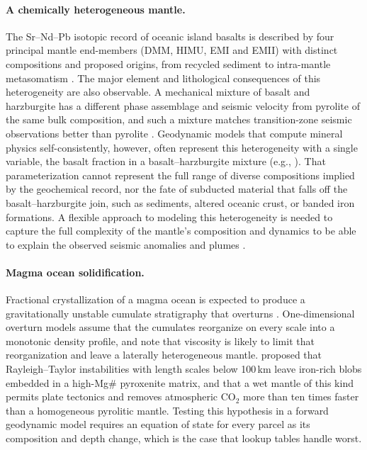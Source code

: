 \paragraph{A chemically heterogeneous mantle.} The Sr--Nd--Pb isotopic record of oceanic island basalts is described by four
principal mantle end-members (DMM, HIMU, EMI and EMII) with distinct compositions and proposed origins, from recycled sediment to intra-mantle
metasomatism \citep{hart1988,stracke2005}. The major
element and lithological consequences of this heterogeneity are also observable. A mechanical mixture of basalt and harzburgite
has a different phase assemblage and seismic velocity from pyrolite of the same bulk composition, and such a mixture matches
transition-zone seismic observations better than pyrolite \citep{xu2008,stixrude2012}. Geodynamic models that compute mineral
physics self-consistently, however, often represent this heterogeneity with a single variable, the basalt fraction in a
basalt--harzburgite mixture (e.g., \citealp{nakagawa2010,yuan2026}). That parameterization cannot represent the full range of diverse compositions implied by
the geochemical record, nor the fate of subducted material that falls off the basalt--harzburgite join, such as sediments, altered
oceanic crust, or banded iron formations. A flexible approach to modeling this heterogeneity is needed to capture the full complexity 
of the mantle's composition and dynamics to be able to explain the observed seismic anomalies and plumes \citep{keller2023,dobson2005}.

\paragraph{Magma ocean solidification.} Fractional crystallization of a magma ocean is expected to produce a gravitationally unstable
cumulate stratigraphy that overturns \citep{elkins-tanton2003,elkins-tanton2011}. One-dimensional overturn models assume that the
cumulates reorganize on every scale into a monotonic density profile, and \citet{elkins-tanton2003} note that viscosity is likely to
limit that reorganization and leave a laterally heterogeneous mantle. \citet{miyazaki2022} proposed that Rayleigh--Taylor
instabilities with length scales below 100\,km leave iron-rich blobs embedded in a high-Mg\# pyroxenite matrix, and that a wet
mantle of this kind permits plate tectonics and removes atmospheric CO$_2$ more than ten times faster than a homogeneous pyrolitic
mantle. Testing this hypothesis in a forward geodynamic model requires an equation of state for every parcel as its composition
and depth change, which is the case that lookup tables handle worst.

